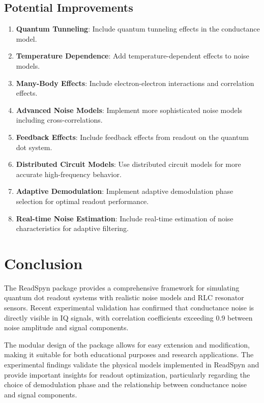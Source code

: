 \documentclass{article}
\begin{document}
\subsection{Potential Improvements}

\begin{enumerate}
\item \textbf{Quantum Tunneling}: Include quantum tunneling effects in the conductance model.
\item \textbf{Temperature Dependence}: Add temperature-dependent effects to noise models.
\item \textbf{Many-Body Effects}: Include electron-electron interactions and correlation effects.
\item \textbf{Advanced Noise Models}: Implement more sophisticated noise models including cross-correlations.
\item \textbf{Feedback Effects}: Include feedback effects from readout on the quantum dot system.
\item \textbf{Distributed Circuit Models}: Use distributed circuit models for more accurate high-frequency behavior.
\item \textbf{Adaptive Demodulation}: Implement adaptive demodulation phase selection for optimal readout performance.
\item \textbf{Real-time Noise Estimation}: Include real-time estimation of noise characteristics for adaptive filtering.
\end{enumerate}

\section{Conclusion}

The ReadSpyn package provides a comprehensive framework for simulating quantum dot readout systems with realistic noise models and RLC resonator sensors. Recent experimental validation has confirmed that conductance noise is directly visible in IQ signals, with correlation coefficients exceeding 0.9 between noise amplitude and signal components.

The modular design of the package allows for easy extension and modification, making it suitable for both educational purposes and research applications. The experimental findings validate the physical models implemented in ReadSpyn and provide important insights for readout optimization, particularly regarding the choice of demodulation phase and the relationship between conductance noise and signal components.
\end{document}
